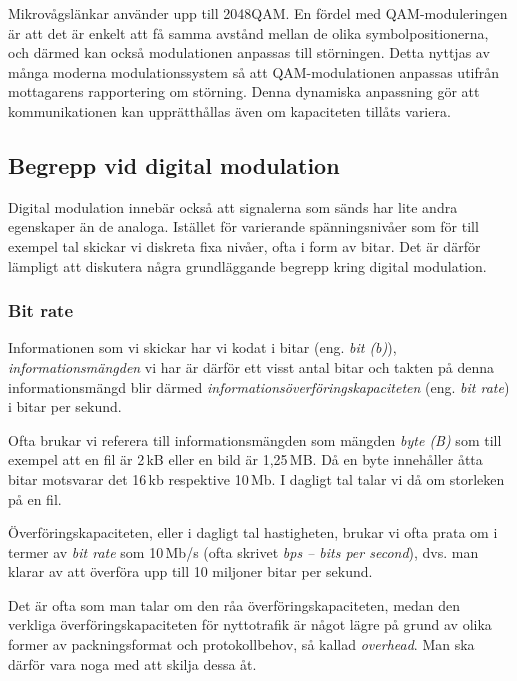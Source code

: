 Mikrovågslänkar använder upp till 2048QAM.
En fördel med QAM-moduleringen är att det är enkelt att få samma avstånd mellan
de olika symbolpositionerna, och därmed kan också modulationen anpassas
till störningen.
Detta nyttjas av många moderna modulationssystem så att QAM-modulationen
anpassas utifrån mottagarens rapportering om störning.
Denna dynamiska anpassning gör att kommunikationen kan upprätthållas även om
kapaciteten tillåts variera.

\subsection{Begrepp vid digital modulation}

Digital modulation innebär också att signalerna som sänds har lite
andra egenskaper än de analoga.
Istället för varierande spänningsnivåer som för till exempel tal skickar vi
diskreta fixa nivåer, ofta i form av bitar.
Det är därför lämpligt att diskutera några grundläggande begrepp kring digital
modulation.


\subsubsection{Bit rate}

Informationen som vi skickar har vi kodat i bitar (eng. \emph{bit (b)}),
\emph{informationsmängden} vi har är därför ett visst antal bitar och takten på
denna informationsmängd blir därmed \emph{informationsöverföringskapaciteten}
(eng. \emph{bit rate}) i bitar per sekund.

Ofta brukar vi referera till informationsmängden som mängden \emph{byte (B)}
som till exempel att en fil är 2\,kB eller en bild är 1,25\,MB.
Då en byte innehåller åtta bitar motsvarar det 16\,kb respektive 10\,Mb.
I dagligt tal talar vi då om storleken på en fil.

Överföringskapaciteten, eller i dagligt tal hastigheten, brukar vi ofta prata
om i termer av \emph{bit rate} som 10\,Mb/s (ofta skrivet \emph{bps -- bits per
second}), dvs. man klarar av att överföra upp till 10 miljoner bitar per sekund.

Det är ofta som man talar om den råa överföringskapaciteten, medan den
verkliga överföringskapaciteten för nyttotrafik är något lägre på grund av
olika former av packningsformat och protokollbehov, så kallad \emph{overhead}.
Man ska därför vara noga med att skilja dessa åt.

